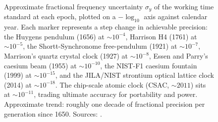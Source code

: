 \begin{figure}[ht]
\caption[Time-precision arc 1656-2020]{Approximate fractional
frequency uncertainty $\sigma_{y}$ of the working time standard at
each epoch, plotted on a $-\log_{10}$ axis against calendar year.
Each marker represents a step change in achievable precision: the
Huygens pendulum (1656) at $\sim 10^{-4}$, Harrison H4 (1761) at
$\sim 10^{-5}$, the Shortt-Synchronome free-pendulum (1921) at
$\sim 10^{-7}$, Marrison's quartz crystal clock (1927) at
$\sim 10^{-8}$, Essen and Parry's caesium beam (1955) at
$\sim 10^{-10}$, the NIST-F1 caesium fountain (1999) at
$\sim 10^{-15}$, and the JILA/NIST strontium optical lattice
clock (2014) at $\sim 10^{-18}$. The chip-scale atomic clock
(CSAC, $\sim 2011$) sits at $\sim 10^{-11}$, trading ultimate
accuracy for portability and power. Approximate trend: roughly
one decade of fractional precision per generation since 1650.
Sources: \cite{paper:ch06t3-marrison-1948,
paper:ch06t3-essen-parry-1955, web:nist-cesium-fountain,
web:ch06t3-nist-strontium-2024, web:ch06t3-microsemi-csac-2024,
hist:ch06t3-sobel-longitude-1995}.}
\label{fig:vol01:ch06:time-precision-arc}
\end{figure}
